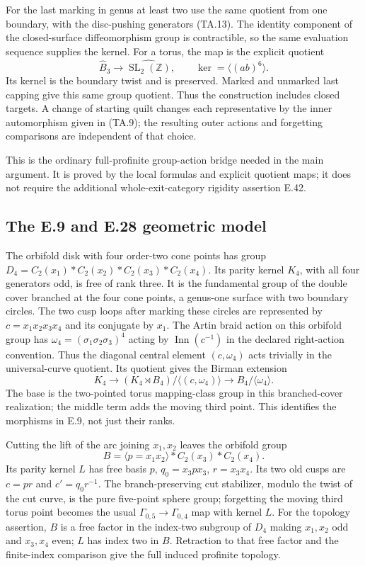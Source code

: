 For the last marking in genus at least two use the same quotient from
one boundary, with the disc-pushing generators (TA.13).  The identity
component of the closed-surface diffeomorphism group is contractible,
so the same evaluation sequence supplies the kernel.  For a torus,
the map is the explicit quotient
\[
          \widehat B_3\longrightarrow
          \widehat{\operatorname{SL}_2(\mathbb Z)},
             \qquad \ker=\overline{\langle(ab)^6\rangle}.
\]
Its kernel is the boundary twist and is preserved.  Marked and unmarked
last capping give this same group quotient.  Thus the construction
includes closed targets.  A change of starting quilt changes each
representative by the inner automorphism given in (TA.9); the resulting
outer actions and forgetting comparisons are independent of that choice.

This is the ordinary full-profinite group-action bridge needed in the
main argument.  It is proved by the local formulas and explicit quotient
maps; it does not require the additional whole-exit-category rigidity
assertion E.42.

\subsection{The E.9 and E.28 geometric model}

The orbifold disk with four order-two cone points has group
$D_4=C_2(x_1)*C_2(x_2)*C_2(x_3)*C_2(x_4)$.
Its parity kernel $K_4$, with all four generators odd, is free of
rank three.  It is the fundamental group of the double cover branched
at the four cone points, a genus-one surface with two boundary circles.
The two cusp loops after marking these circles are represented by
$c=x_1x_2x_3x_4$ and its conjugate by $x_1$.
The Artin braid action on this orbifold group has
$\omega_4=(\sigma_1\sigma_2\sigma_3)^4$ acting by
$\operatorname{Inn}(c^{-1})$ in the declared right-action convention.
Thus the diagonal central element $(c,\omega_4)$ acts trivially in
the universal-curve quotient.  Its quotient gives the Birman extension
\[
 K_4\longrightarrow
 (K_4\rtimes B_4)/\langle(c,\omega_4)\rangle
       \longrightarrow B_4/\langle\omega_4\rangle.
\]
The base is the two-pointed torus mapping-class group in this
branched-cover realization; the middle term adds the moving third
point.  This identifies the morphisms in E.9, not just their ranks.

Cutting the lift of the arc joining $x_1,x_2$ leaves the orbifold group
\[
 B=\langle p=x_1x_2\rangle*C_2(x_3)*C_2(x_4).
\]
Its parity kernel $L$ has free basis
$p$, $q_0=x_3px_3$, $r=x_3x_4$.  Its two old cusps are
$c=pr$ and $c'=q_0r^{-1}$.  The branch-preserving cut stabilizer,
modulo the twist of the cut curve, is the pure five-point sphere group;
forgetting the moving third torus point becomes the usual
$\Gamma_{0,5}\to\Gamma_{0,4}$ map with kernel $L$.
For the topology assertion, $B$ is a free factor in the index-two
subgroup of $D_4$ making $x_1,x_2$ odd and $x_3,x_4$ even;
$L$ has index two in $B$.  Retraction to that free factor and the
finite-index comparison give the full induced profinite topology.


